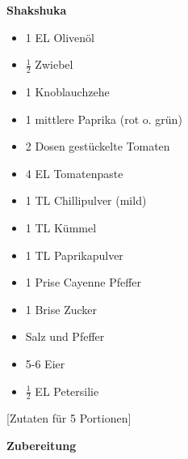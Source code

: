 
\parindent0pt	

\pagestyle{empty}


\textbf{{\LARGE Shakshuka}}%


\hrulefill
\vspace*{\fill}
\begin{multicols}{2}	


\begin{itemize}
\item 1 EL Olivenöl
\item $\frac{1}{2}$ Zwiebel
\item 1 Knoblauchzehe
\item 1 mittlere Paprika (rot o. grün)
\item 2 Dosen gestückelte Tomaten
\item 4 EL Tomatenpaste
\item 1 TL Chillipulver (mild)
\item 1 TL Kümmel
\item 1 TL Paprikapulver			%
\item 1 Prise Cayenne Pfeffer
\item 1 Brise Zucker
\item Salz und Pfeffer
\item 5-6 Eier
\item $\frac{1}{2}$ EL Petersilie
\end{itemize}
\end{multicols}

\vspace{1cm}			%
\begin{center}			%
[Zutaten für 5 Portionen]%
\end{center}


\vfill
\newpage
\textbf{{\LARGE Zubereitung}}%

\hrulefill


